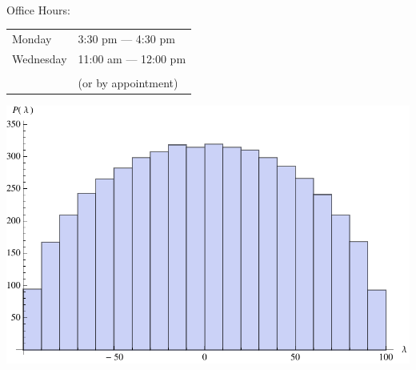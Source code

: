 \documentclass[12pt]{amsart}
\numberwithin{equation}{section}
\begin{document}
{}\ {}

\vspace{100pt}

  \begin{center}

  \huge

  \thispagestyle{empty}

  {\sc Office Hours:}

  \bigskip
  \bigskip
  \bigskip

  \begin{tabular}{ll}
  Monday &3:30 pm --- 4:30 pm\\
  Wednesday &11:00 am --- 12:00 pm\\\\
  \qquad\qquad\qquad\qquad\qquad&{(or by appointment)}
  \end{tabular}

  \vspace{80pt}

  \includegraphics{img/Wigner.pdf}





  \end{center}

  
\end{document}
